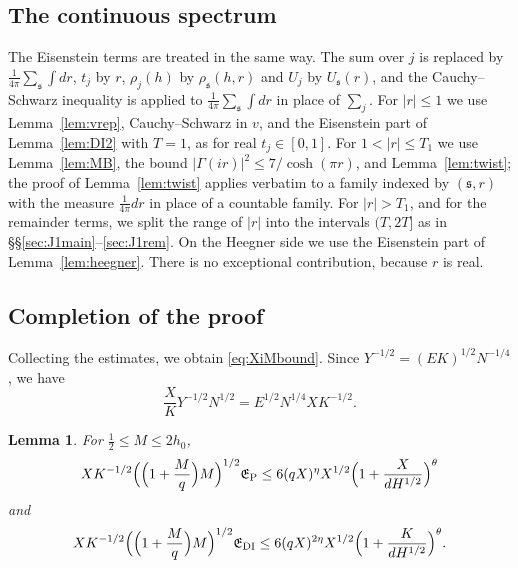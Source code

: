 \documentclass[11pt]{amsart}
\newtheorem{lemma}[theorem]{Lemma}
\theoremstyle{remark}
\theoremstyle{definition}
\numberwithin{equation}{section}
\newcommand{\gs}{\mathfrak{s}}
\begin{document}
\subsection{The continuous spectrum}
The Eisenstein terms are treated in the same way. The sum over $j$ is replaced by $\frac1{4\pi}\sum_\gs\int dr$, $t_j$ by $r$, $\rho_j(h)$ by $\rho_\gs(h,r)$ and $U_j$ by $U_\gs(r)$, and the Cauchy--Schwarz inequality is applied to $\frac1{4\pi}\sum_\gs\int dr$ in place of $\sum_j$. For $|r|\le1$ we use Lemma~\ref{lem:vrep}, Cauchy--Schwarz in $v$, and the Eisenstein part of Lemma~\ref{lem:DI2} with $T=1$, as for real $t_j\in[0,1]$. For $1<|r|\le T_1$ we use Lemma~\ref{lem:MB}, the bound $|\Gamma(ir)|^2\le7/\cosh(\pi r)$, and Lemma~\ref{lem:twist}; the proof of Lemma~\ref{lem:twist} applies verbatim to a family indexed by $(\gs,r)$ with the measure $\frac1{4\pi}dr$ in place of a countable family. For $|r|>T_1$, and for the remainder terms, we split the range of $|r|$ into the intervals $(T,2T]$ as in \S\S\ref{sec:J1main}--\ref{sec:J1rem}. On the Heegner side we use the Eisenstein part of Lemma~\ref{lem:heegner}. There is no exceptional contribution, because $r$ is real.

\subsection{Completion of the proof}
Collecting the estimates, we obtain \eqref{eq:XiMbound}. Since $Y^{-1/2}=(EK)^{1/2}N^{-1/4}$, we have
\[
\frac XKY^{-1/2}N^{1/2}=E^{1/2}N^{1/4}XK^{-1/2}.
\]

\begin{lemma}\label{lem:Mopt}
For $\frac12\le M\le2h_0$,
\[
XK^{-1/2}\Bigl(\Bigl(1+\frac Mq\Bigr)M\Bigr)^{1/2}\mathfrak E_{\mathrm P}\le6(qX)^{\eta}X^{1/2}\Bigl(1+\frac X{dH^{1/2}}\Bigr)^\theta
\]
and
\[
XK^{-1/2}\Bigl(\Bigl(1+\frac Mq\Bigr)M\Bigr)^{1/2}\mathfrak E_{\mathrm{DI}}\le6(qX)^{2\eta}X^{1/2}\Bigl(1+\frac K{dH^{1/2}}\Bigr)^\theta.
\]
\end{lemma}
\end{document}
